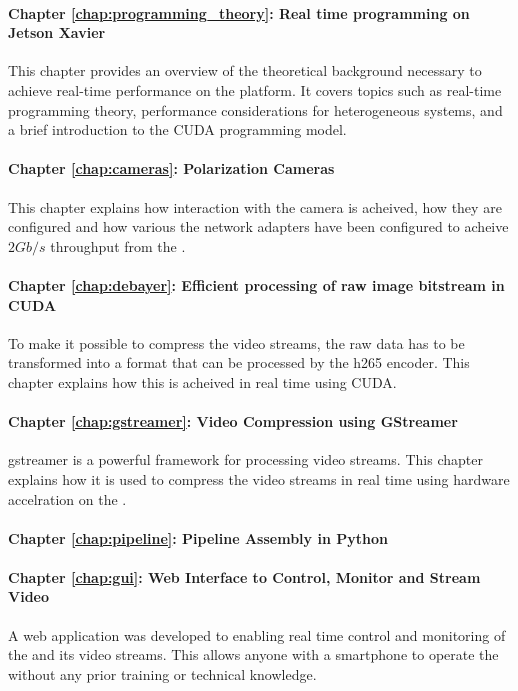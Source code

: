 \paragraph{Chapter \ref{chap:programming_theory}: Real time programming on Jetson Xavier}
This chapter provides an overview of the theoretical background necessary to achieve real-time performance on the \jx platform.
It covers topics such as real-time programming theory, performance considerations for heterogeneous systems, and a brief introduction to the CUDA programming model.

\paragraph{Chapter \ref{chap:cameras}: Polarization Cameras}
This chapter explains how interaction with the camera is acheived, how they are configured and how various the network adapters have been configured to acheive $2Gb/s$ throughput from the \cams.

\paragraph{Chapter \ref{chap:debayer}: Efficient processing of raw image bitstream in CUDA}
To make it possible to compress the video streams, the raw data has to be transformed into a format that can be processed by the \gls{h265} encoder.
This chapter explains how this is acheived in real time using CUDA.

\paragraph{Chapter \ref{chap:gstreamer}: Video Compression using GStreamer}
\gls{gstreamer} is a powerful framework for processing video streams.
This chapter explains how it is used to compress the video streams in real time using hardware accelration on the \jx.

\paragraph{Chapter \ref{chap:pipeline}: Pipeline Assembly in Python}
\todo


\paragraph{Chapter \ref{chap:gui}: Web Interface to Control, Monitor and Stream Video}
A web application was developed to enabling real time control and monitoring of the \sr and its video streams.
This allows anyone with a smartphone to operate the \sr without any prior training or technical knowledge.



